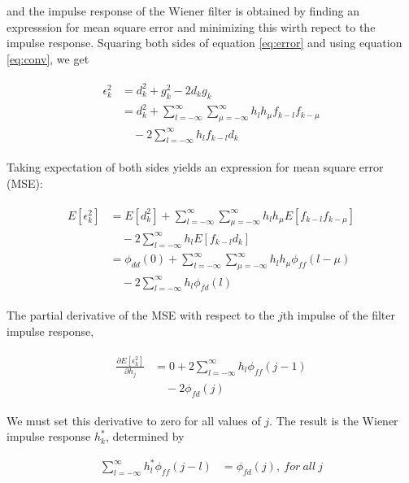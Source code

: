 \documentclass[8pt,a4paper]{article}
\begin{document}
\begin{multicols}{2}
and the impulse response of the Wiener filter is obtained by finding an expresssion for mean square error and minimizing this wirth repect to the impulse response. 
Squaring both sides of equation \ref{eq:error} and using equation \ref{eq:conv}, we get

\begin{align}
  \begin{split}
    \epsilon_{k}^{2}&= d_{k}^{2} + g_{k}^{2} -2d_{k}g_{k} \\
    &= d_{k}^{2} + \sum_{l=-\infty}^{\infty} \sum_{\mu=-\infty}^{\infty} h_{l}h_{\mu}f_{k-l}f_{k-\mu} \\ 
    &\quad -2 \sum_{l=-\infty}^{\infty} h_{l}f_{k-l}d_{k}
  \end{split}
\end{align}

Taking expectation of both sides yields an expression for mean square error (MSE):

\begin{align}
  \begin{split}
      E \left[ \epsilon_{k}^{2} \right] &= E \left[ d_{k}^{2} \right] + \sum_{l=-\infty}^{\infty} \sum_{\mu=-\infty}^{\infty} h_{l} h_{\mu}  E \left[ f_{k-l} f_{k-\mu} \right] \\ 
      &\quad  -2 \sum_{l=-\infty}^{\infty} h_{l} E \left[ f_{k-l} d_{k}  \right] \\
      &= \phi_{dd}(0) + \sum_{l=-\infty}^{\infty} \sum_{\mu=-\infty}^{\infty} h_{l}h_{\mu} \phi_{ff}(l-\mu) \\
      &\quad  -2 \sum_{l=-\infty}^{\infty} h_{l}\phi_{fd}(l)
  \end{split}
\end{align}

The partial derivative of the MSE with respect to the $j$th impulse of the filter impulse response, 

\begin{align}
  \begin{split}
  \frac{ \partial E \left[ \epsilon_{k}^{2} \right]  }{ \partial h_{j} } &= 0 + 2 \sum_{l=-\infty}^{\infty} h_{l} \phi_{ff}(j-1) \\
  &\quad -2 \phi_{fd}(j)
  \end{split}
\end{align}

We must set this derivative to zero for all values of $j$. The result is the Wiener impulse response $h_{k}^{*}$, determined by

\begin{align}
  \sum_{l=-\infty}^{\infty} h_{l}^{*} \phi_{ff}(j-l) &= \phi_{fd}(j),\ for\ all\ j
\end{align}


\end{multicols}
\end{document}
